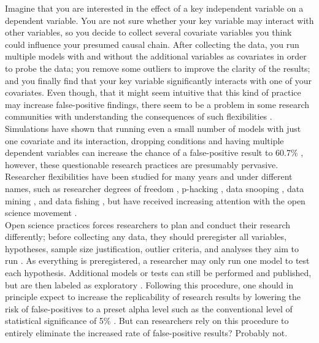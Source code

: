Imagine that you are interested in the effect of a key independent variable on a dependent variable. You are not sure whether your key variable may interact with other variables, so you decide to collect several covariate variables you think could influence your presumed causal chain. After collecting the data, you run multiple models with and without the additional variables as covariates in order to probe the data; you remove some outliers to improve the clarity of the results; and you finally find that your key variable significantly interacts with one of your covariates.
Even though, that it might seem intuitive that this kind of practice may increase false-positive findings, there seem to be a problem in some research communities with understanding the consequences of such flexibilities \citep{Makel2021,John2012,Agnoli2017,fraser2018}. 
Simulations have shown that running even a small number of models with just one covariate and its interaction, dropping conditions and having multiple dependent variables can increase the chance of a false-positive result to 60.7\% \citep{Simmons2011}, however, these questionable research practices are presumably pervasive.
Researcher flexibilities have been studied for many years and under different names, such as researcher degrees of freedom \citep{Simmons2011}, p-hacking \citep{simonsohn2014p}, data snooping \citep{white2000reality}, data mining \citep{lovell1983}, and data fishing \citep{selvin1966data}, but have received increasing attention with the open science movement \citep{banks2019answers}.   \\

Open science practices forces researchers to plan and conduct their research differently; before collecting any data, they should preregister all variables, hypotheses, sample size justification, outlier criteria, and analyses they aim to run \citep{Simmons2020, VANTVEER20162}. As everything is preregistered, a researcher may only run one model to test each hypothesis. Additional models or tests can still be performed and published, but are then labeled as exploratory \citep{Nosek2018}. Following this procedure, one should in principle expect to increase the replicability of research results by lowering the risk of false-positives to a preset alpha level such as the conventional level of statistical significance of 5\% \citep{Moore2016}. But can researchers rely on this procedure to entirely eliminate the increased rate of false-positive results? Probably not. \\


